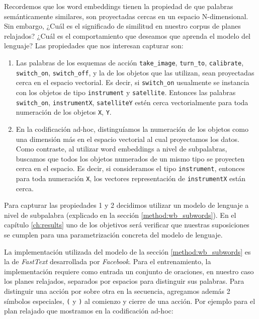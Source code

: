 Recordemos que los word embeddings tienen la propiedad de que palabras
semánticamente similares, son proyectadas cercas en un espacio N-dimensional.
Sin embargo, ¿Cuál es el significado de similitud en nuestro corpus de planes
relajados? ¿Cuál es el comportamiento que deseamos que aprenda el modelo del
lenguaje? Las propiedades que nos interesan capturar son:

\begin{enumerate}
    \item Las palabras de los esquemas de acción \verb|take_image|,
    \verb|turn_to|, \verb|calibrate|, \verb|switch_on|, \verb|switch_off|, y la
    de los objetos que las utilizan, sean proyectadas cerca en el espacio
    vectorial. Es decir, si \verb|switch_on| usualmente se instancia con los
    objetos de tipo \verb|instrument| y \verb|satellite|. Entonces las palabras
    \verb|switch_on|, \verb|instrumentX|, \verb|satelliteY| estén cerca
    vectorialmente para toda numeración de los objetos \verb|X|, \verb|Y|.
    \item En la codificación ad-hoc, distinguíamos la numeración de los objetos
    como una dimensión más en el espacio vectorial al cual proyectamos los
    datos. Como contraste, al utilizar word embeddings a nivel de
    subpalabras, buscamos que todos los objetos numerados de un mismo tipo se
    proyecten cerca en el espacio. Es decir, si consideramos el tipo
    \verb|instrument|, entonces para toda numeración \verb|X|, los vectores
    representación de \verb|instrumentX| están cerca.
\end{enumerate}

Para capturar las propiedades 1 y 2 decidimos utilizar un modelo de lenguaje a
nivel de subpalabra (explicado en la sección \ref{method:wb_subwords}). En el
capítulo \ref{ch:results} uno de los objetivos será verificar que nuestras
suposiciones se cumplen para una parametrización concreta del modelo de
lenguaje.

La implementación utilizada del modelo de la sección \ref{method:wb_subwords} es
la de \emph{FastText} \citep{Bojanowski-Grave-Joulin-Mikolov-2016} desarrollada por \emph{Facebook}.
Para el entrenamiento, la implementación requiere como entrada un conjunto de
oraciones, en nuestro caso los planes relajados, separados por espacios para
distinguir sus palabras. Para distinguir una acción por sobre otra en la
secuencia, agregamos además 2 símbolos especiales, \verb|(| y \verb|)| al
comienzo y cierre de una acción. Por ejemplo para el plan relajado que mostramos
en la codificación ad-hoc:

